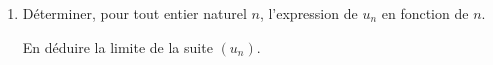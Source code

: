 \documentclass[10pt]{article}
\begin{document}
\begin{enumerate}
Démontrer que $\left(v_n\right)$ est une suite arithmétique. 

Préciser sa raison et son premier terme. 

En déduire, pour tout entier naturel $n$, l'expression de $v_n$ en fonction de $n$.
\item Déterminer, pour tout entier naturel $n$, l'expression de $u_n$ en fonction de $n$.

En déduire la limite de la suite $\left(u_n\right)$.
\end{enumerate}

\bigskip
\end{document}

